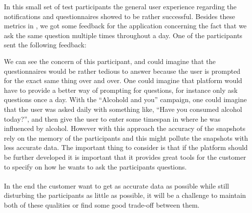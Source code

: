 In this small set of test participants the general user experience regarding the notifications and questionnaires showed to be rather successful. Besides these metrics in , we got some feedback for the application concerning the fact that we ask the same question multiple times throughout a day. One of the participants sent the following feedback:

\begin{quote}
\end{quote}

We can see the concern of this participant, and could imagine that the questionnaires would be rather tedious to answer because the user is prompted for the exact same thing over and over. One could imagine that platform would have to provide a better way of prompting for questions, for instance only ask questions once a day. With the ``Alcohold and you'' campaign, one could imagine that the user was asked daily with something like, ``Have you consumed alcohol today?'', and then give the user to enter some timespan in where he was influenced by alcohol. However with this approach the accuracy of the snapshots rely on the memory of the participants and this might pollute the snapshots with less accurate data. The important thing to consider is that if the platform should be further developed it is important that it provides great tools for the customer to specify on how he wants to ask the participants questions. 
\\\\
In the end the customer want to get as accurate data as possible while still disturbing the participants as little as possible, it will be a challenge to maintain both of these qualities or find some good trade-off between them.